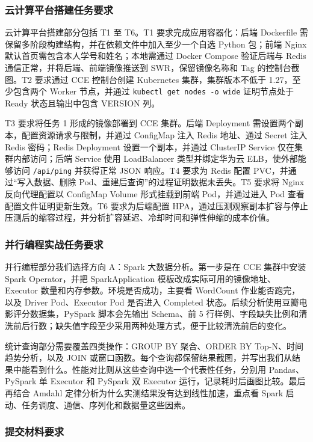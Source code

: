 \subsubsection{云计算平台搭建任务要求}

云计算平台搭建部分包括 T1 至 T6。T1 要求完成应用容器化：后端 Dockerfile 需保留多阶段构建结构，并在依赖文件中加入至少一个自选 Python 包；前端 Nginx 默认首页需包含本人学号和姓名；本地需通过 Docker Compose 验证后端与 Redis 通信正常，并将后端、前端镜像推送到 SWR，保留镜像名称和 Tag 的控制台截图。T2 要求通过 CCE 控制台创建 Kubernetes 集群，集群版本不低于 1.27，至少包含两个 Worker 节点，并通过 \verb|kubectl get nodes -o wide| 证明节点处于 Ready 状态且输出中包含 VERSION 列。

T3 要求将任务 1 形成的镜像部署到 CCE 集群。后端 Deployment 需设置两个副本，配置资源请求与限制，并通过 ConfigMap 注入 Redis 地址、通过 Secret 注入 Redis 密码；Redis Deployment 设置一个副本，并通过 ClusterIP Service 仅在集群内部访问；后端 Service 使用 LoadBalancer 类型并绑定华为云 ELB，使外部能够访问 \verb|/api/ping| 并获得正常 JSON 响应。T4 要求为 Redis 配置 PVC，并通过“写入数据、删除 Pod、重建后查询”的过程证明数据未丢失。T5 要求将 Nginx 反向代理配置以 ConfigMap Volume 形式挂载到前端 Pod，并通过进入 Pod 查看配置文件证明更新生效。T6 要求为后端配置 HPA，通过压测观察副本扩容与停止压测后的缩容过程，并分析扩容延迟、冷却时间和弹性伸缩的成本价值。

\subsubsection{并行编程实战任务要求}

并行编程部分我们选择方向 A：Spark 大数据分析。第一步是在 CCE 集群中安装 Spark Operator，并把 SparkApplication 模板改成实际可用的镜像地址、Executor 数量和内存参数。环境是否成功，主要看 WordCount 作业能否跑完，以及 Driver Pod、Executor Pod 是否进入 Completed 状态。后续分析使用豆瓣电影评分数据集，PySpark 脚本会先输出 Schema、前 5 行样例、字段缺失比例和清洗前后行数；缺失值字段至少采用两种处理方式，便于比较清洗前后的变化。

统计查询部分需要覆盖四类操作：GROUP BY 聚合、ORDER BY Top-N、时间趋势分析，以及 JOIN 或窗口函数。每个查询都保留结果截图，并写出我们从结果中能看到什么。性能对比则从这些查询中选一个代表性任务，分别用 Pandas、PySpark 单 Executor 和 PySpark 双 Executor 运行，记录耗时后画图比较。最后再结合 Amdahl 定律分析为什么实测结果没有达到线性加速，重点看 Spark 启动、任务调度、通信、序列化和数据量这些因素。

\subsubsection{提交材料要求}

